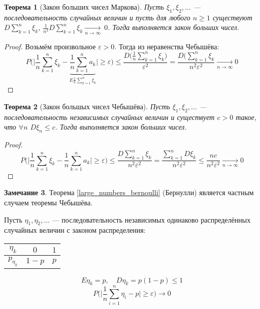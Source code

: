 \documentclass[11pt,openany,a4paper]{scrartcl}
\theoremstyle{plain}
\newtheorem{theorem}{Теорема}[subsection]
\theoremstyle{definition}
\newtheorem{remark}[theorem]{Замечание}
\newcommand{\underto}[1]{\xrightarrow[#1]{}}
\begin{document}
\begin{theorem}[Закон больших чисел Маркова]
    Пусть $\xi_1, \xi_2,\ldots$ — последовательность случайных величин и пусть
    для любого $n \geqslant 1$ существуют $D\sum\limits_{k=1}^n \xi_k$,
    $\frac{1}{n^2}D\sum\limits_{k=1}^n \xi_k \underto{n \to \infty}~0$.
    Тогда выполняется закон больших чисел.
\end{theorem}
\begin{proof}
    Возьмём произвольное $\varepsilon > 0$. Тогда из неравенства Чебышёва:
    $$
    P\bigg(\bigg|\frac{1}{n}\sum\limits_{k=1}^n\xi_k -
    \underbrace{\frac{1}{n}\sum\limits_{k=1}^na_k}_
    {E\frac{1}{n}\sum\limits_{k=1}^n \xi_k}
    \bigg| \geqslant \varepsilon\bigg) \leqslant
    \frac{D\Big(\frac{1}{n}\sum\limits_{k=1}^n \xi_k\Big)}{\varepsilon^2} =
    \frac{D\Big(\sum\limits_{k=1}^n \xi_k}{n^2 \varepsilon^2}
    \underto{n \to \infty} 0
    $$
\end{proof}
\begin{theorem}[Закон большых чисел Чебышёва]
    Пусть $\xi_1, \xi_2,\ldots$ — последовательность независимых случайных величин
    и существует $c > 0$ такое, что $\forall n$ $D\xi_n \leqslant c$. Тогда
    выполняется закон больших чисел.
\end{theorem}
\begin{proof}
    $$
    P\bigg(\bigg|\frac{1}{n}\sum\limits_{k=1}^n\xi_k -
    \frac{1}{n}\sum\limits_{k=1}^na_k\bigg| \geqslant \varepsilon\bigg) \leqslant
    \frac{D\sum\limits_{k=1}^n\xi_k}{n^2\varepsilon^2} =
    \frac{\sum\limits_{k=1}^n D\xi_k}{n^2\varepsilon^2} \leqslant
    \frac{nc}{n^2\varepsilon^2} \underto{n \to \infty} 0
    $$
\end{proof}
\begin{remark}
    Теорема \ref{large_numbers_bernoulli} (Бернулли) является частным случаем
    теоремы Чебышёва.
    
    Пусть $\eta_1, \eta_2,\ldots$ — последовательность независимых одинаково
    распределённых случайных величин с законом распределения:
    \begin{center}
        \begin{tabular}{| c | c | c |}
            \hline
            $\eta_k$ & $0$ & $1$ \\ \hline
            $p_{\eta_k}$ & $1-p$ & $p$ \\ \hline
        \end{tabular}
    \end{center}
    $$
    E\eta_k = p,\quad D\eta_k = p(1-p) \leqslant 1
    $$
    $$
    P\bigg(\bigg|\frac{1}{n}\sum\limits_{i=1}^n \eta_i - p\bigg| \geqslant 
    \varepsilon\bigg) \to 0
    $$
\end{remark}
\end{document}

